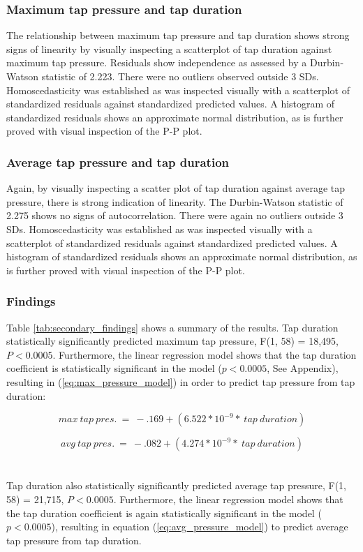 \documentclass{sigchi}
\begin{document}
\subsubsection{Maximum tap pressure and tap duration}
The relationship between maximum tap pressure and tap duration shows strong signs of linearity by visually inspecting a scatterplot of tap duration against maximum tap pressure. Residuals show independence as assessed by a Durbin-Watson statistic of 2.223. There were no outliers observed outside 3 SDs. Homoscedasticity was established as was inspected visually with a scatterplot of standardized residuals against standardized predicted values. A histogram of standardized residuals shows an approximate normal distribution, as is further proved with visual inspection of the P-P plot.

\subsubsection{Average tap pressure and tap duration}
Again, by visually inspecting a scatter plot of tap duration against average tap pressure, there is strong indication of linearity. The Durbin-Watson statistic of 2.275 shows no signs of autocorrelation. There were again no outliers outside 3 SDs. Homoscedasticity was established as was inspected visually with a scatterplot of standardized residuals against standardized predicted values. A histogram of standardized residuals shows an approximate normal distribution, as is further proved with visual inspection of the P-P plot.

\subsubsection{Findings}

Table \ref{tab:secondary_findings} shows a summary of the results. Tap duration statistically significantly predicted maximum tap pressure, F(1, 58) = 18,495, $P < 0.0005$. Furthermore, the linear regression model shows that the tap duration coefficient is statistically significant in the model ($p < 0.0005$, See Appendix), resulting in (\ref{eq:max_pressure_model}) in order to predict tap pressure from tap duration:

\begin{equation}
max\ tap\ pres.\ =\ -.169 + (6.522*10^{-9} *\ tap\ duration)
\label{eq:max_pressure_model}
\end{equation}

\begin{equation}
avg\ tap\ pres.\ =\ -.082 + (4.274*10^{-9} *\ tap\ duration)
\label{eq:avg_pressure_model}
\end{equation}
\\\\
Tap duration also statistically significantly predicted average tap pressure, F(1, 58) = 21,715, $P < 0.0005$. Furthermore, the linear regression model shows that the tap duration coefficient is again statistically significant in the model ($p < 0.0005$), resulting in equation (\ref{eq:avg_pressure_model}) to predict average tap pressure from tap duration.
\end{document}
